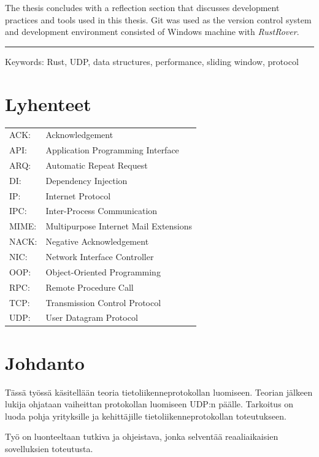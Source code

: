 \documentclass[a4paper,12pt]{article}
\newcommand*\sepline{
    \begin{center}
        \rule[1ex]{\textwidth}{.5pt}
    \end{center}}
\begin{document}
\begin{titlepage}
        The thesis concludes with a reflection section that discusses development practices and tools used in this thesis. Git was used as the version control system and development environment consisted of Windows machine with \textit{RustRover}.

        \sepline
        Keywords: Rust, UDP, data structures, performance, sliding window, protocol 
        \newpage


        \tableofcontents
        \newpage


        \section*{Lyhenteet}
        \begin{tabular}{l l}
            ACK: & Acknowledgement               \\
            API: & Application Programming Interface \\
            ARQ: & Automatic Repeat Request      \\
            DI:  & Dependency Injection          \\
            IP:  & Internet Protocol             \\
            IPC: & Inter-Process Communication   \\
            MIME: & Multipurpose Internet Mail Extensions \\
            NACK: & Negative Acknowledgement     \\
            NIC: & Network Interface Controller  \\
            OOP: & Object-Oriented Programming   \\
            RPC: & Remote Procedure Call         \\
            TCP: & Transmission Control Protocol \\
            UDP: & User Datagram Protocol        \\
        \end{tabular}
        \newpage


    \end{titlepage}

\pagestyle{plain}

    \section{Johdanto}\label{sec:johdanto}
    Tässä työssä käsitellään teoria tietoliikenneprotokollan luomiseen. Teorian jälkeen lukija ohjataan vaiheittan protokollan luomiseen UDP:n päälle. Tarkoitus on luoda pohja yrityksille ja kehittäjille tietoliikenneprotokollan toteutukseen.
    \par Työ on luonteeltaan tutkiva ja ohjeistava, jonka selventää reaaliaikaisien sovelluksien toteutusta.\par
\end{document}
